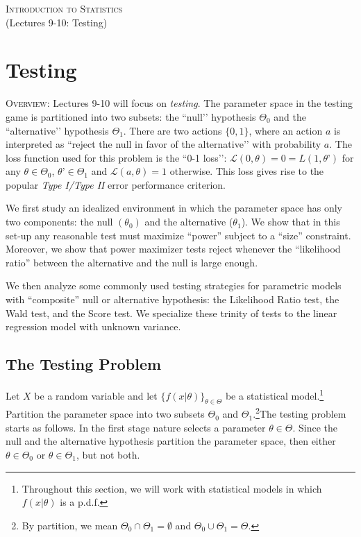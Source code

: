 \documentclass[11pt]{article} %
\begin{document}
\onehalfspace

\vspace*{\fill}
\begingroup
\centering

\Large {\scshape Introduction to Statistics}\\

(Lectures 9-10: Testing)

\endgroup
\vspace*{\fill}

\newpage


\section{Testing}

{\scshape Overview:} \noindent Lectures 9-10 will focus on \emph{testing}. The parameter space in the testing game is partitioned into two subsets: the ``null’’ hypothesis $\Theta_0$ and the ``alternative’’ hypothesis $\Theta_1$. There are two actions $\{0,1\}$, where an action $a$ is interpreted as ``reject the null in favor of the alternative’’ with probability $a$. The loss function used for this problem is the ``0-1 loss’’: $\mathcal{L}(0,\theta) = 0 =  L(1,\theta’)$ for any $\theta \in \Theta_0$, $\theta’ \in \Theta_1$ and $\mathcal{L}(a,\theta)=1$ otherwise. This loss gives rise to the popular \emph{Type I/Type II} error performance criterion. 

We first study an idealized environment in which the parameter space has only two components: the null $(\theta_0)$ and the alternative ($\theta_1$). We show that in this set-up any reasonable test must maximize “power” subject to a “size” constraint. Moreover, we show that power maximizer tests reject whenever the “likelihood ratio” between the alternative and the null is large enough. 


We then analyze some commonly used testing strategies for parametric models with “composite” null or alternative hypothesis: the Likelihood Ratio test, the Wald test, and the Score test. We specialize these trinity of tests to the linear regression model with unknown variance.  



\subsection{The Testing Problem} 

Let $X$ be a random variable and let $\{f(x | \theta)\}_{\theta \in \Theta}$ be a statistical model.\footnote{Throughout this section, we will work with statistical models in which $f(x | \theta)$ is a p.d.f.} Partition the parameter space into two subsets $\Theta_0$ and $\Theta_1$.\footnote{By partition, we mean $\Theta_0 \cap \Theta_1 = \emptyset$ and $\Theta_0 \cup \Theta_1 = \Theta$.}The testing problem starts as follows. In the first stage nature selects a parameter $\theta \in \Theta$. Since the null and the alternative hypothesis partition the parameter space, then either $\theta \in \Theta_0$ or $\theta \in \Theta_1$, but not both. 
\end{document}
